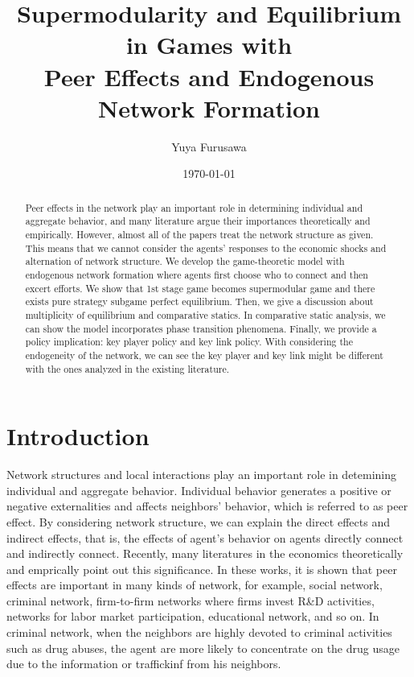 \documentclass[12pt]{article}
\theoremstyle{definition}
\begin{document}
\title{Supermodularity and Equilibrium in Games with \\ Peer Effects and Endogenous Network Formation}

\author{Yuya Furusawa}

\date{\today}

\maketitle

\begin{abstract}
Peer effects in the network play an important role in determining individual and aggregate behavior, and many literature argue their importances theoretically and empirically.
However, almost all of the papers treat the network structure as given.
This means that we cannot consider the agents' responses to the economic shocks and alternation of network structure.
We develop the game-theoretic model with endogenous network formation where agents first choose who to connect and then excert efforts.
We show that 1st stage game becomes supermodular game and there exists pure strategy subgame perfect equilibrium.
Then, we give a discussion about multiplicity of equilibrium and comparative statics.
In comparative static analysis, we can show the model incorporates phase transition phenomena.
Finally, we provide a policy implication: key player policy and key link policy.
With considering the endogeneity of the network, we can see the key player and key link might be different with the ones analyzed in the existing literature.
\end{abstract}


\section{Introduction}

Network structures and local interactions play an important role in detemining individual and aggregate behavior.
Individual behavior generates a positive or negative externalities and affects neighbors' behavior, which is referred to as peer effect.
By considering network structure, we can explain the direct effects and indirect effects, that is, the effects of agent's behavior on agents directly connect and indirectly connect.
Recently, many literatures in the economics theoretically and emprically point out this significance.
In these works, it is shown that peer effects are important in many kinds of network, for example, social network, criminal network, firm-to-firm networks where firms invest R\&D activities, networks for labor market participation, educational network, and so on.
In criminal network, when the neighbors are highly devoted to criminal activities such as drug abuses, the agent are more likely to concentrate on the drug usage due to the information or traffickinf from his neighbors.
\end{document}
